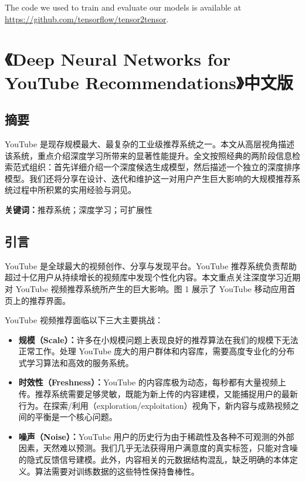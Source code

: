 The code we used to train and evaluate our models is available at
\url{https://github.com/tensorflow/tensor2tensor}.


\chapter{《Deep Neural Networks for YouTube Recommendations》中文版}

\section{摘要}

YouTube 是现存规模最大、最复杂的工业级推荐系统之一。本文从高层视角描述该系统，重点介绍深度学习所带来的显著性能提升。全文按照经典的两阶段信息检索范式组织：首先详细介绍一个深度候选生成模型，然后描述一个独立的深度排序模型。我们还将分享在设计、迭代和维护这一对用户产生巨大影响的大规模推荐系统过程中所积累的实用经验与洞见。

\textbf{关键词：}推荐系统；深度学习；可扩展性

\section{引言}

YouTube 是全球最大的视频创作、分享与发现平台。YouTube 推荐系统负责帮助超过十亿用户从持续增长的视频库中发现个性化内容。本文重点关注深度学习近期对 YouTube 视频推荐系统所产生的巨大影响。图 1 展示了 YouTube 移动应用首页上的推荐界面。

YouTube 视频推荐面临以下三大主要挑战：

\begin{itemize}
  \item \textbf{规模（Scale）：}许多在小规模问题上表现良好的推荐算法在我们的规模下无法正常工作。处理 YouTube 庞大的用户群体和内容库，需要高度专业化的分布式学习算法和高效的服务系统。
  \item \textbf{时效性（Freshness）：}YouTube 的内容库极为动态，每秒都有大量视频上传。推荐系统需要足够灵敏，既能为新上传的内容建模，又能捕捉用户的最新行为。在探索/利用（exploration/exploitation）视角下，新内容与成熟视频之间的平衡是一个核心问题。
  \item \textbf{噪声（Noise）：}YouTube 用户的历史行为由于稀疏性及各种不可观测的外部因素，天然难以预测。我们几乎无法获得用户满意度的真实标签，只能对含噪的隐式反馈信号建模。此外，内容相关的元数据结构混乱，缺乏明确的本体定义。算法需要对训练数据的这些特性保持鲁棒性。
\end{itemize}


